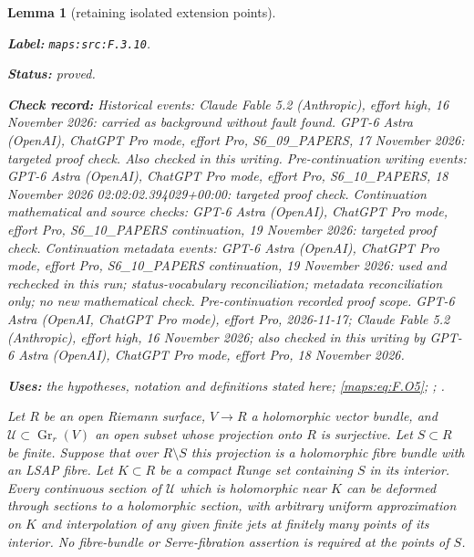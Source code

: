 \documentclass[11pt,a4paper]{article}
\newtheorem{lemma}[lemma]{Lemma}
\theoremstyle{definition}
\newcommand{\StatementRecord}[4]{\par\smallskip\begingroup\upshape\raggedright\noindent\textbf{Label:} \nolinkurl{#1}.\par\noindent\textbf{Status:} #2.\par\noindent\textbf{Check record:} #3.\par\noindent\textbf{Uses:} #4.\par\endgroup\smallskip}
\begin{document}
\begin{lemma}[retaining isolated extension points]\label{maps:src:F.3.10}
\StatementRecord{maps:src:F.3.10}{proved}{Historical events: Claude Fable 5.2 (Anthropic), effort high, 16 November 2026: carried as background without fault found. GPT-6 Astra (OpenAI), ChatGPT Pro mode, effort Pro, S6\_09\_PAPERS, 17 November 2026: targeted proof check. Also checked in this writing. Pre-continuation writing events: GPT-6 Astra (OpenAI), ChatGPT Pro mode, effort Pro, S6\_10\_PAPERS, 18 November 2026 02:02:02.394029+00:00: targeted proof check. Continuation mathematical and source checks: GPT-6 Astra (OpenAI), ChatGPT Pro mode, effort Pro, S6\_10\_PAPERS continuation, 19 November 2026: targeted proof check. Continuation metadata events: GPT-6 Astra (OpenAI), ChatGPT Pro mode, effort Pro, S6\_10\_PAPERS continuation, 19 November 2026: used and rechecked in this run; status-vocabulary reconciliation; metadata reconciliation only; no new mathematical check. \emph{Pre-continuation recorded proof scope.} GPT-6 Astra (OpenAI, ChatGPT Pro mode), effort Pro, 2026-11-17; Claude Fable 5.2 (Anthropic), effort high, 16 November 2026; also checked in this writing by GPT-6 Astra (OpenAI), ChatGPT Pro mode, effort Pro, 18 November 2026}{the hypotheses, notation and definitions stated here; \cref{maps:eq:F.O5}; \cite[Theorem 1.2, preprint p.~3]{ffForstnericPrezelj02}; \cite[Theorem 2.13, p.~9]{IVVOkaOneV5}}


Let $R$ be an open Riemann surface, $V\to R$ a holomorphic vector
bundle, and $\mathscr U\subset\operatorname{Gr}_r(V)$ an open
subset whose projection onto $R$ is surjective.  Let $S\subset R$
be finite.  Suppose that over $R\setminus S$ this projection is
a holomorphic fibre bundle with an LSAP fibre.  Let $K\subset R$
be a compact Runge set containing $S$ in its interior.
Every continuous section of $\mathscr U$ which is holomorphic
near $K$ can be deformed through sections to a holomorphic
section, with arbitrary uniform approximation on $K$ and
interpolation of any given finite jets at finitely many points
of its interior.  No fibre-bundle or Serre-fibration assertion
is required at the points of $S$.

\end{lemma}
\end{document}
